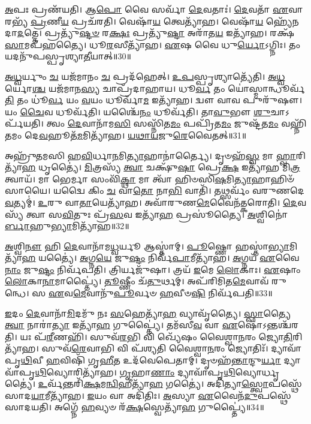 \-\ul{𑌅}\-𑌪𑌃 𑌪𑍍𑌰𑌣᳴𑌯𑌤𑌿।
𑌆\-\ul{𑌪𑍋} 𑌵𑍈 𑌸𑌰𑍍𑌵𑌾᳴ \ul{𑌦𑍇}\-𑌵𑌤𑌾𑌃॑।
\-\ul{𑌦𑍇}\-𑌵𑌤𑌾᳴ \ul{𑌏}\-𑌵𑌾𑌰𑌭𑍍𑌯᳴ \ul{𑌪𑍍𑌰}\-𑌣𑍀\-\ul{𑌯} 𑌪𑍍𑌰𑌚᳴𑌰𑌤𑌿।
𑌵𑍇𑌷𑌾᳴\-\ul{𑌯} 𑌤𑍍𑌵𑍇𑌤𑍍𑌯𑌾᳴𑌹।
𑌵𑍇𑌷𑌾᳴\-\ul{𑌯} 𑌹𑍍𑌯𑍇᳴𑌨𑌦𑌾\-\ul{𑌦}\-𑌤𑍍𑌤𑍇।
𑌪𑍍𑌰𑌤𑍍𑌯𑍁᳴\-\ul{𑌷𑍍𑌟}\-\-\ul{𑍞} 𑌰\-\ul{𑌕𑍍𑌷𑌃} 𑌪𑍍𑌰𑌤𑍍𑌯𑍁᳴\-\ul{𑌷𑍍𑌟𑌾} 𑌅𑌰𑌾᳴𑌤\-\ul{𑌯} 𑌇𑌤𑍍𑌯𑌾᳴𑌹।
𑌰𑌕𑍍𑌷᳴\-\ul{𑌸𑌾}\-𑌮𑌪᳴𑌹𑌤𑍍𑌯𑍈।
𑌧𑍂\-\ul{𑌰}\-𑌸𑍀𑌤𑍍𑌯𑌾᳴𑌹।
\-\ul{𑌏}\-𑌷 𑌵𑍈 𑌧𑍁\-\ul{𑌰𑍍𑌯𑍋}\-\-𑌽𑌗𑍍𑌨𑌿𑌃।
𑌤𑌂 𑌯𑌦𑌨𑍁᳴𑌪𑌸𑍍𑌪𑍃𑌶𑍍𑌯𑌾\-\ul{𑌤𑍀}\-𑌯𑌾𑌤𑍍॥30॥

\-\ul{𑌅}\-\-\ul{𑌧𑍍𑌵}\-𑌰𑍍𑌯𑍁𑌂 \ul{𑌚} 𑌯𑌜᳴𑌮𑌾𑌨𑌂 \ul{𑌚} 𑌪𑍍𑌰𑌦᳴𑌹𑍇𑌤𑍍।
\-\ul{𑌉}\-\-\ul{𑌪}\-𑌸𑍍𑌪𑍃𑌶𑍍𑌯𑌾𑌤𑍍𑌯𑍇᳴𑌤𑌿।
\-\ul{𑌅}\-\-\ul{𑌧𑍍𑌵}\-𑌰𑍍𑌯𑍋\-\ul{𑌶𑍍𑌚} 𑌯𑌜᳴𑌮𑌾𑌨\-\ul{𑌸𑍍𑌯} 𑌚𑌾𑌪𑍍𑌰᳴𑌦𑌾𑌹𑌾𑌯।
𑌧𑍂\-\ul{𑌰𑍍𑌵} 𑌤𑌂 𑌯𑍋॑𑌸𑍍𑌮𑌾𑌨𑍍𑌧𑍂𑌰𑍍𑌵᳴\-\ul{𑌤𑌿} 𑌤𑌂 𑌧𑍂॑\-\ul{𑌰𑍍𑌵} 𑌯𑌂 \ul{𑌵}\-𑌯𑌂 𑌧𑍂𑌰𑍍𑌵𑌾᳴\-\ul{𑌮} 𑌇𑌤𑍍𑌯𑌾᳴𑌹।
𑌦𑍍𑌵𑍗 𑌵𑌾𑌵 𑌪𑍁𑌰𑍁᳴𑌷𑍗।
𑌯𑌂 \ul{𑌚𑍈}\-𑌵 𑌧𑍂𑌰𑍍𑌵᳴𑌤𑌿।
𑌯𑌶𑍍𑌚𑍈᳴\-\ul{𑌨𑌂} 𑌧𑍂𑌰𑍍𑌵᳴𑌤𑌿।
𑌤𑌾\-\ul{𑌵𑍁}\-𑌭𑍗 \ul{𑌶𑍁}\-𑌚𑌾\-𑌽𑌰𑍍𑌪᳴𑌯𑌤𑌿।
𑌤𑍍𑌵𑌂 \ul{𑌦𑍇}\-𑌵𑌾𑌨𑌾᳴𑌮\-\ul{𑌸𑌿} 𑌸𑌸𑍍𑌨𑌿᳴𑌤\-\ul{𑌮𑌂} 𑌪𑌪𑍍𑌰𑌿᳴𑌤\-\ul{𑌮𑌂} 𑌜𑍁𑌷𑍍𑌟᳴𑌤\-\ul{𑌮𑌂} 𑌵𑌹𑍍𑌨𑌿᳴𑌤𑌮𑌂 𑌦𑍇\-\ul{𑌵}\-𑌹𑍂𑌤᳴\-\ul{𑌮}\-𑌮𑌿𑌤𑍍𑌯𑌾᳴𑌹।
\-\ul{𑌯}\-\-\ul{𑌥𑌾}\-\-\ul{𑌯}\-𑌜𑍁\-\ul{𑌰𑍇}\-𑌵𑍈𑌤𑌤𑍍॥31॥

𑌅𑌹𑍍𑌰𑍁᳴𑌤𑌮𑌸𑌿 𑌹\-\ul{𑌵𑌿}\-𑌰𑍍𑌧𑌾\-\ul{𑌨}\-𑌮𑌿\-\ul{𑌤𑍍𑌯𑌾}\-𑌹𑌾𑌨𑌾॑𑌰𑍍𑌤𑍍𑌯𑍈।
𑌦𑍃𑍞𑌹᳴\-\ul{𑌸𑍍𑌵} 𑌮𑌾 \ul{𑌹𑍍𑌵𑌾}\-𑌰𑌿𑌤𑍍𑌯𑌾᳴\-\ul{𑌹} 𑌧𑍃𑌤𑍍𑌯𑍈॑।
\-\ul{𑌮𑌿}\-𑌤𑍍𑌰𑌸𑍍𑌯᳴ \ul{𑌤𑍍𑌵𑌾} 𑌚𑌕𑍍𑌷𑍁᳴\-\ul{𑌷𑌾} 𑌪𑍍𑌰𑍇\-\ul{𑌕𑍍𑌷} 𑌇𑌤𑍍𑌯𑌾᳴𑌹 𑌮𑌿\-\ul{𑌤𑍍𑌰}\-𑌤𑍍𑌵𑌾𑌯᳴।
𑌮𑌾 𑌭𑍇𑌰𑍍𑌮𑌾 𑌸𑌂𑌵𑌿᳴\-\ul{𑌕𑍍𑌥𑌾} 𑌮𑌾 𑌤𑍍𑌵𑌾᳴ 𑌹𑌿𑍞𑌸𑌿\-\ul{𑌷}\-𑌮𑌿\-\ul{𑌤𑍍𑌯𑌾}\-𑌹𑌾𑌹𑌿𑍞᳴𑌸𑌾𑌯𑍈।
𑌯𑌦𑍍𑌵𑍈 𑌕𑌿𑌂 \ul{𑌚} 𑌵𑌾\-\ul{𑌤𑍋} 𑌨𑌾\-\ul{𑌭𑌿} 𑌵𑌾𑌤𑌿᳴।
𑌤𑌥𑍍𑌸𑌰𑍍𑌵𑌂᳴ 𑌵𑌰𑍁𑌣𑌦𑍇\-\ul{𑌵}\-𑌤𑍍𑌯𑌮𑍍॑।
\-\ul{𑌉}\-𑌰𑍁 𑌵𑌾\-\ul{𑌤𑌾}\-𑌯𑍇𑌤𑍍𑌯𑌾᳴𑌹।
𑌅𑌵𑌾᳴𑌰𑍁𑌣\-\ul{𑌮𑍇}\-𑌵𑍈𑌨᳴𑌤𑍍𑌕𑌰𑍋𑌤𑌿।
\-\ul{𑌦𑍇}\-𑌵𑌸𑍍𑌯᳴ 𑌤𑍍𑌵𑌾 𑌸\-\ul{𑌵𑌿}\-𑌤𑍁𑌃 𑌪𑍍𑌰᳴\-\ul{𑌸}\-𑌵 𑌇𑌤𑍍𑌯𑌾᳴\-\ul{𑌹} 𑌪𑍍𑌰𑌸𑍂॑𑌤𑍍𑌯𑍈।
\-\ul{𑌅}\-𑌶𑍍𑌵𑌿𑌨𑍋॑\-\ul{𑌰𑍍𑌬𑌾}\-𑌹𑍁\-\ul{𑌭𑍍𑌯𑌾}\-𑌮𑌿𑌤𑍍𑌯𑌾᳴𑌹॥32॥

\-\ul{𑌅}\-𑌶𑍍𑌵𑌿\-\ul{𑌨𑍗} 𑌹𑌿 \ul{𑌦𑍇}\-𑌵𑌾𑌨𑌾᳴𑌮\-\ul{𑌧𑍍𑌵}\-𑌰𑍍𑌯𑍂 𑌆𑌸𑍍𑌤𑌾॑𑌮𑍍।
\-\ul{𑌪𑍂}\-𑌷𑍍𑌣𑍋 𑌹𑌸𑍍𑌤𑌾॑\-\ul{𑌭𑍍𑌯𑌾}\-𑌮𑌿𑌤𑍍𑌯𑌾᳴\-\ul{𑌹} 𑌯𑌤𑍍𑌯𑍈॑।
\-\ul{𑌅}\-𑌗𑍍𑌨\-\ul{𑌯𑍇} 𑌜𑍁\-\ul{𑌷𑍍𑌟𑌂} 𑌨𑌿𑌰𑍍𑌵᳴\-\ul{𑌪𑌾}\-𑌮𑍀𑌤𑍍𑌯𑌾᳴𑌹।
\-\ul{𑌅}\-𑌗𑍍𑌨𑌯᳴ \ul{𑌏}\-𑌵𑍈\-\ul{𑌨𑌾𑌂} 𑌜𑍁\-\ul{𑌷𑍍𑌟𑌂} 𑌨𑌿𑌰𑍍𑌵᳴𑌪𑌤𑌿।
𑌤𑍍𑌰𑌿𑌰𑍍𑌯𑌜𑍁᳴𑌷𑌾।
𑌤𑍍𑌰𑌯᳴ \ul{𑌇}\-𑌮𑍇 \ul{𑌲𑍋}\-𑌕𑌾𑌃।
\-\ul{𑌏}\-𑌷𑌾𑌂 \ul{𑌲𑍋}\-𑌕𑌾\-\ul{𑌨𑌾}\-𑌮𑌾𑌪𑍍𑌤𑍍𑌯𑍈॑।
\-\ul{𑌤𑍂}\-𑌷𑍍𑌣𑍀𑌂 𑌚᳴\-\ul{𑌤𑍁}\-𑌰𑍍𑌥𑌮𑍍।
𑌅𑌪᳴𑌰𑌿𑌮𑌿𑌤\-\ul{𑌮𑍇}\-𑌵𑌾𑌵᳴ 𑌰𑍁𑌨𑍍𑌧𑍇।
𑌸 \ul{𑌏}\-𑌵\-\ul{𑌮𑍇}\-𑌵𑌾𑌨𑍁᳴\-\ul{𑌪𑍂}\-𑌰𑍍𑌵𑍞 \ul{𑌹}\-𑌵𑍀𑍞\-\ul{𑌷𑌿} 𑌨𑌿𑌰𑍍𑌵᳴𑌪𑌤𑌿॥33॥

\-\ul{𑌇}\-𑌦𑌂 \ul{𑌦𑍇}\-𑌵𑌾𑌨𑌾᳴\-\ul{𑌮𑌿}\-𑌦𑌮𑍁᳴ 𑌨𑌃 \ul{𑌸}\-𑌹𑍇𑌤𑍍𑌯𑌾᳴\-\ul{𑌹} 𑌵𑍍𑌯𑌾𑌵𑍃᳴𑌤𑍍𑌯𑍈।
\-\ul{𑌸𑍍𑌫𑌾}\-𑌤𑍍𑌯𑍈 \ul{𑌤𑍍𑌵𑌾} 𑌨𑌾𑌰𑌾॑\-\ul{𑌤𑍍𑌯𑌾} 𑌇𑌤𑍍𑌯𑌾᳴\-\ul{𑌹} 𑌗𑍁𑌪𑍍𑌤𑍍𑌯𑍈॑।
𑌤𑌮᳴𑌸𑍀\-\ul{𑌵} 𑌵𑌾 \ul{𑌏}\-𑌷𑍋॑\-𑌽𑌨𑍍𑌤𑌶𑍍𑌚᳴𑌰𑌤𑌿।
𑌯𑌃 𑌪᳴\-\ul{𑌰𑍀}\-𑌣𑌹𑌿᳴।
𑌸𑍁𑌵᳴\-\ul{𑌰}\-𑌭𑌿 𑌵𑌿 𑌖𑍍𑌯𑍇᳴𑌷𑌂 𑌵𑍈𑌶𑍍𑌵𑌾\-\ul{𑌨}\-𑌰𑌂 𑌜𑍍𑌯𑍋\-\ul{𑌤𑌿}\-𑌰𑌿𑌤𑍍𑌯𑌾᳴𑌹।
𑌸𑍁𑌵᳴\-\ul{𑌰𑍇}\-𑌵𑌾𑌭𑌿 𑌵𑌿 𑌪᳴𑌶𑍍𑌯𑌤𑌿 𑌵𑍈𑌶𑍍𑌵𑌾\-\ul{𑌨}\-𑌰𑌂 𑌜𑍍𑌯𑍋𑌤𑌿𑌃᳴।
𑌦𑍍𑌯𑌾𑌵𑌾᳴𑌪𑍃\-\ul{𑌥𑌿}\-𑌵𑍀 \ul{𑌹}\-𑌵𑌿𑌷𑌿᳴ 𑌗𑍃\-\ul{𑌹𑍀}\-𑌤 𑌉𑌦᳴𑌵𑍇𑌪𑍇𑌤𑌾𑌮𑍍।
𑌦𑍃𑍞𑌹᳴\-\ul{𑌨𑍍𑌤𑌾}\-𑌨𑍍𑌦𑍁\-\ul{𑌰𑍍𑌯𑌾} 𑌦𑍍𑌯𑌾𑌵𑌾᳴𑌪𑍃\-\ul{𑌥𑌿}\-𑌵𑍍𑌯𑍋𑌰𑌿𑌤𑍍𑌯𑌾᳴𑌹।
\-\ul{𑌗𑍃}\-𑌹𑌾\-\ul{𑌣𑌾𑌂} 𑌦𑍍𑌯𑌾𑌵𑌾᳴𑌪𑍃\-\ul{𑌥𑌿}\-𑌵𑍍𑌯𑍋𑌰𑍍𑌧𑍃𑌤𑍍𑌯𑍈॑।
\-\ul{𑌉}\-𑌰𑍍𑌵᳴𑌨𑍍𑌤𑌰𑌿᳴\-\ul{𑌕𑍍𑌷}\-𑌮\-\ul{𑌨𑍍𑌵𑌿}\-𑌹𑍀𑌤𑍍𑌯𑌾᳴\-\ul{𑌹} 𑌗𑌤𑍍𑌯𑍈॑।
𑌅𑌦𑌿᳴𑌤𑍍𑌯𑌾\-\ul{𑌸𑍍𑌤𑍍𑌵𑍋}\-𑌪𑌸𑍍𑌥𑍇᳴ 𑌸𑌾𑌦\-\ul{𑌯𑌾}\-𑌮𑍀𑌤𑍍𑌯𑌾᳴𑌹।
\-\ul{𑌇}\-𑌯𑌂 𑌵𑌾 𑌅𑌦𑌿᳴𑌤𑌿𑌃।
\-\ul{𑌅}\-𑌸𑍍𑌯𑌾 \ul{𑌏}\-𑌵𑍈𑌨᳴\-\ul{𑌦𑍁}\-𑌪𑌸𑍍𑌥𑍇᳴ 𑌸𑌾𑌦𑌯𑌤𑌿।
𑌅𑌗𑍍𑌨𑍇᳴ \ul{𑌹}\-𑌵𑍍𑌯𑍞 𑌰᳴\-\ul{𑌕𑍍𑌷}\-𑌸𑍍𑌵𑍇𑌤𑍍𑌯𑌾᳴\-\ul{𑌹} 𑌗𑍁𑌪𑍍𑌤𑍍𑌯𑍈॑॥34॥\anuvakamend[\-\ul{𑌯}\-𑌜𑍍𑌞𑍋 𑌵𑌾 𑌆\-\ul{𑌪𑍋} 𑌧𑌾𑌮᳴ \ul{𑌪𑍍𑌰}\-𑌣𑍀\-\ul{𑌯} 𑌪𑍍𑌰𑌚᳴𑌰𑌤𑍍𑌯\-\ul{𑌤𑍀}\-𑌯𑌾\-\ul{𑌦𑍇}\-𑌤\-\ul{𑌦𑍍𑌬𑌾}\-𑌹𑍁\-\ul{𑌭𑍍𑌯𑌾}\-𑌮𑌿𑌤𑍍𑌯𑌾᳴𑌹 \ul{𑌹}\-𑌵𑍀𑍞\-\ul{𑌷𑌿} 𑌨𑌿𑌰𑍍𑌵᳴𑌪\-\ul{𑌤𑌿} 𑌗𑌤𑍍𑌯𑍈᳴ \ul{𑌚}\-𑌤𑍍𑌵𑌾𑌰𑌿᳴ 𑌚]


